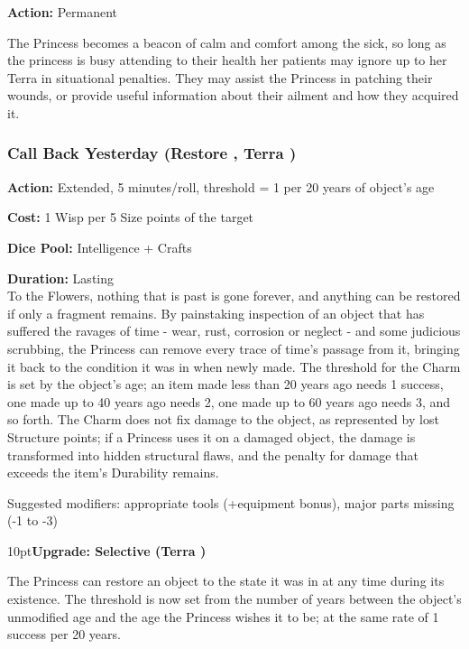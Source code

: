 \noindent \textbf{Action:} Permanent

\noindent The Princess becomes a beacon of calm and comfort among the sick, so long as the princess is busy attending to their health her patients may ignore up to her Terra in situational penalties. They may assist the Princess in patching their wounds, or provide useful information about their ailment and how they acquired it. 

\subsubsection*{Call Back Yesterday (Restore \textbullet, Terra \textbullet)}

\noindent \textbf{Action:} Extended, 5 minutes/roll, threshold = 1 per 20 years of object's age

\noindent \textbf{Cost:} 1 Wisp per 5 Size points of the target

\noindent \textbf{Dice Pool:} Intelligence + Crafts

\noindent \textbf{Duration:} Lasting \\

\noindent To the Flowers, nothing that is past is gone forever, and anything can be restored if only a fragment remains. By painstaking inspection of an object that has suffered the ravages of time - wear, rust, corrosion or neglect - and some judicious scrubbing, the Princess can remove every trace of time's passage from it, bringing it back to the condition it was in when newly made. The threshold for the Charm is set by the object's age; an item made less than 20 years ago needs 1 success, one made up to 40 years ago needs 2, one made up to 60 years ago needs 3, and so forth. The Charm does not fix damage to the object, as represented by lost Structure points; if a Princess uses it on a damaged object, the damage is transformed into hidden structural flaws, and the penalty for damage that exceeds the item's Durability remains.

Suggested modifiers: appropriate tools (+equipment bonus), major parts missing (-1 to -3)
\begin{myindentpar}{10pt}\textbf{Upgrade: Selective (Terra \textbullet\textbullet)}

The Princess can restore an object to the state it was in at any time during its existence. The threshold is now set from the number of years between the object's unmodified age and the age the Princess wishes it to be; at the same rate of 1 success per 20 years.\end{myindentpar}

